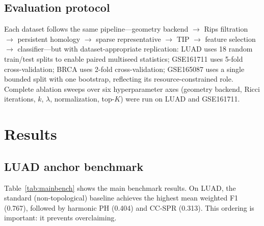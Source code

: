 \documentclass[11pt]{article}
\begin{document}
\subsection{Evaluation protocol}

Each dataset follows the same pipeline---geometry backend $\to$ Rips filtration $\to$ persistent homology $\to$ sparse representative $\to$ TIP $\to$ feature selection $\to$ classifier---but with dataset-appropriate replication:
LUAD uses 18 random train/test splits to enable paired multiseed statistics;
GSE161711 uses 5-fold cross-validation;
BRCA uses 2-fold cross-validation;
GSE165087 uses a single bounded split with one bootstrap, reflecting its resource-constrained role.
Complete ablation sweeps over six hyperparameter axes (geometry backend, Ricci iterations, $k$, $\lambda$, normalization, top-$K$) were run on LUAD and GSE161711.

\section{Results}

\subsection{LUAD anchor benchmark}

Table~\ref{tab:mainbench} shows the main benchmark results.
On LUAD, the standard (non-topological) baseline achieves the highest mean weighted F1 (0.767), followed by harmonic PH (0.404) and CC-SPR (0.313).
This ordering is important: it prevents overclaiming.
\end{document}

